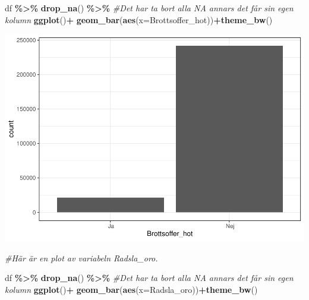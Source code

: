 \documentclass[
]{book}
\newenvironment{Shaded}{\begin{snugshade}}{\end{snugshade}}
\newcommand{\AttributeTok}[1]{\textcolor[rgb]{0.13,0.29,0.53}{#1}}
\newcommand{\CommentTok}[1]{\textcolor[rgb]{0.56,0.35,0.01}{\textit{#1}}}
\newcommand{\FunctionTok}[1]{\textcolor[rgb]{0.13,0.29,0.53}{\textbf{#1}}}
\newcommand{\NormalTok}[1]{#1}
\newcommand{\SpecialCharTok}[1]{\textcolor[rgb]{0.81,0.36,0.00}{\textbf{#1}}}
\begin{document}
\begin{Shaded}
\begin{Highlighting}[]
\NormalTok{df }\SpecialCharTok{\%\textgreater{}\%} \FunctionTok{drop\_na}\NormalTok{() }\SpecialCharTok{\%\textgreater{}\%} \CommentTok{\#Det har ta bort alla NA annars det får sin egen kolumn}
  \FunctionTok{ggplot}\NormalTok{()}\SpecialCharTok{+} \FunctionTok{geom\_bar}\NormalTok{(}\FunctionTok{aes}\NormalTok{(}\AttributeTok{x=}\NormalTok{Brottsoffer\_hot))}\SpecialCharTok{+}\FunctionTok{theme\_bw}\NormalTok{()}
\end{Highlighting}
\end{Shaded}

\includegraphics{_main_files/figure-latex/unnamed-chunk-6-1.pdf}

\begin{Shaded}
\begin{Highlighting}[]
\CommentTok{\#Här är en plot av variabeln \textquotesingle{}Radsla\_oro\textquotesingle{}.  }

\NormalTok{df }\SpecialCharTok{\%\textgreater{}\%} \FunctionTok{drop\_na}\NormalTok{() }\SpecialCharTok{\%\textgreater{}\%} \CommentTok{\#Det har ta bort alla NA annars det får sin egen kolumn}
  \FunctionTok{ggplot}\NormalTok{()}\SpecialCharTok{+} \FunctionTok{geom\_bar}\NormalTok{(}\FunctionTok{aes}\NormalTok{(}\AttributeTok{x=}\NormalTok{Radsla\_oro))}\SpecialCharTok{+}\FunctionTok{theme\_bw}\NormalTok{()}
\end{Highlighting}
\end{Shaded}
\end{document}

